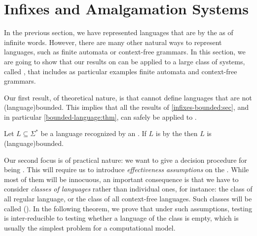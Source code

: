 \section{Infixes and Amalgamation Systems}
\label{infixes-amalgamation:sec}

\AP In the previous section, we have represented languages that are
 by the  as  of infinite
words. However, there are many other natural ways to represent languages, such
as finite automata or context-free grammars. In this section, we are going to
show that our results on  can be applied to a large class
of systems, called , that includes as particular
examples finite automata and context-free grammars. 

\AP Our first result, of theoretical nature, is that 
cannot define  languages that are not
\kl(language){bounded}. This implies that all the results of
\cref{infixes-bounded:sec}, and in particular \cref{bounded-language:thm}, can
safely be applied to .

\begin{theorem}
    \label{infix-amalgamation:thm}
    Let $L \subseteq \Sigma^*$ be a language recognized by an 
    .
    If $L$ is  by the  then $L$ is
    \kl(language){bounded}.
\end{theorem}

\AP Our second focus is of practical nature: we want to give a decision
procedure for being . This will require us to introduce
\emph{effectiveness assumptions} on the . While most
of them will be innocuous, an important consequence is that we have to consider
\emph{classes of languages} rather than individual ones, for instance: the
class of all regular language, or the class of all context-free languages. Such
classes will be called  (). In the following theorem, we prove that under such
assumptions, testing  is inter-reducible to testing
whether a language of the class is empty, which is usually the simplest
problem for a computational model.

